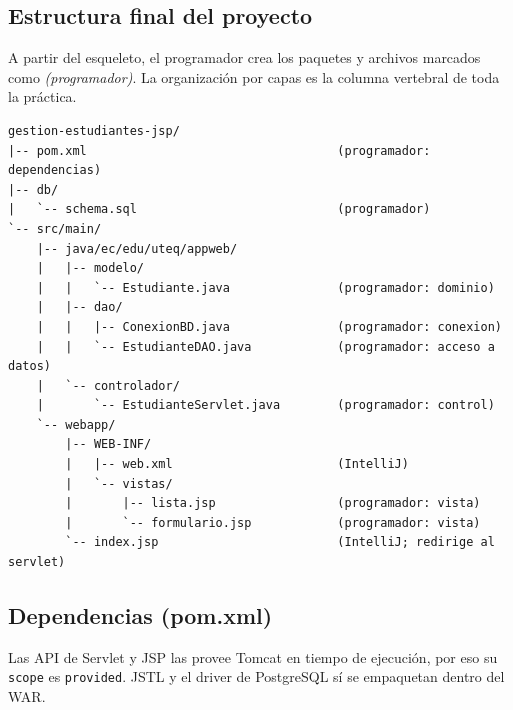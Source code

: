 \documentclass[11pt,a4paper,openany]{book}
\begin{document}
\subsection{Estructura final del proyecto}
\label{ap:crud:jsp:estructura}

A partir del esqueleto, el programador crea los paquetes y archivos
marcados como \emph{(programador)}. La organización por capas es la
columna vertebral de toda la práctica.

\begin{lstlisting}[style=shell,caption={Estructura completa de la pista JSP/JSTL/EL},label={lst:jsp-tree}]
gestion-estudiantes-jsp/
|-- pom.xml                                   (programador: dependencias)
|-- db/
|   `-- schema.sql                            (programador)
`-- src/main/
    |-- java/ec/edu/uteq/appweb/
    |   |-- modelo/
    |   |   `-- Estudiante.java               (programador: dominio)
    |   |-- dao/
    |   |   |-- ConexionBD.java               (programador: conexion)
    |   |   `-- EstudianteDAO.java            (programador: acceso a datos)
    |   `-- controlador/
    |       `-- EstudianteServlet.java        (programador: control)
    `-- webapp/
        |-- WEB-INF/
        |   |-- web.xml                       (IntelliJ)
        |   `-- vistas/
        |       |-- lista.jsp                 (programador: vista)
        |       `-- formulario.jsp            (programador: vista)
        `-- index.jsp                         (IntelliJ; redirige al servlet)
\end{lstlisting}

\subsection{Dependencias (pom.xml)}
\label{ap:crud:jsp:pom}

Las API de Servlet y JSP las provee Tomcat en tiempo de ejecución, por
eso su \texttt{scope} es \texttt{provided}. JSTL y el driver de
PostgreSQL sí se empaquetan dentro del WAR.
\end{document}

